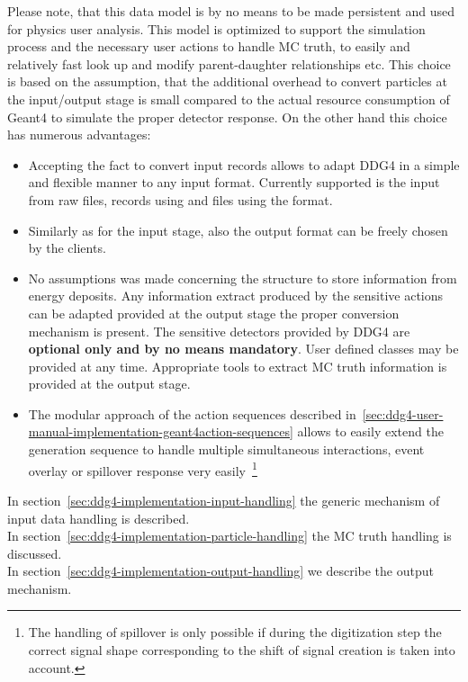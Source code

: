 \documentclass[10pt,a4paper]{article}
\begin{document}
\noindent
Please note, that this data model  is by no means to be made persistent 
and used for physics user analysis. This model is optimized to support
the simulation process and the necessary user actions to handle MC truth,
to easily and relatively fast look up and modify parent-daughter 
relationships etc. This choice is based on the assumption, that the 
additional overhead to convert particles at the input/output 
stage is small compared to the actual resource consumption of Geant4
to simulate the proper detector response.
On the other hand this choice has numerous advantages:
\begin{itemize}\itemcompact
\item Accepting the fact to convert input records allows to adapt 
  DDG4 in a simple and flexible manner to any input format. Currently 
  supported is the input from raw {} files, {} 
  records using {} and {} files using the 
  {} format.
\item Similarly as for the input stage, also the output format 
  can be freely chosen by the clients.
\item No assumptions was made concerning the structure to store 
  information from energy deposits. Any information extract produced
  by the sensitive actions can be adapted provided at the output
  stage the proper conversion mechanism is present. The sensitive 
  detectors provided by DDG4 are {\bf{optional only and by no means mandatory}}.
  User defined classes may be provided at any time. Appropriate tools
  to extract MC truth information is provided at the output stage.
\item The modular approach of the action sequences described 
  in~\ref{sec:ddg4-user-manual-implementation-geant4action-sequences}
  allows to easily extend the generation sequence to handle multiple 
  simultaneous interactions, event overlay or spillover response 
  very easily~\footnote{The handling of spillover is only possible 
  if during the digitization step the correct signal shape corresponding
  to the shift of signal creation is taken into account.}
\end{itemize}

\noindent
In section~\ref{sec:ddg4-implementation-input-handling} the generic mechanism
of input data handling is described. \\
In section~\ref{sec:ddg4-implementation-particle-handling} the MC truth 
handling is discussed. \\
In section~\ref{sec:ddg4-implementation-output-handling} we describe the 
output mechanism.
\newpage
\end{document}
